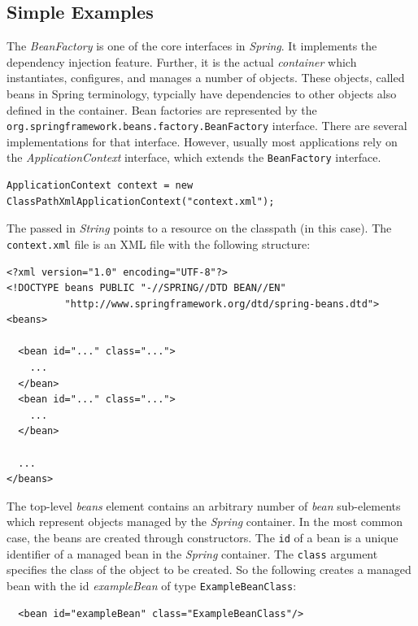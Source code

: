 \subsection{Simple Examples}

The \emph{BeanFactory} is one of the core interfaces in \emph{Spring}. It
implements the dependency injection feature. Further, it is the actual
\emph{container} which instantiates, configures, and manages a number of
objects. These objects, called beans in Spring terminology, typcially have
dependencies to other objects also defined in the container. Bean factories
are represented by the \texttt{org.springframework.beans.factory.BeanFactory}
interface. There are several implementations for that interface. However,
usually most applications rely on the \emph{ApplicationContext} interface, which
extends the \texttt{BeanFactory} interface.

\begin{verbatim}
ApplicationContext context = new ClassPathXmlApplicationContext("context.xml");
\end{verbatim}

The passed in \emph{String} points to a resource on the classpath (in this 
case). The \texttt{context.xml} file is an XML file with the following
structure:

\small{\begin{verbatim}
<?xml version="1.0" encoding="UTF-8"?>
<!DOCTYPE beans PUBLIC "-//SPRING//DTD BEAN//EN" 
          "http://www.springframework.org/dtd/spring-beans.dtd">
<beans>
  
  <bean id="..." class="...">
    ...
  </bean>
  <bean id="..." class="...">
    ...
  </bean>

  ...
</beans>
\end{verbatim}}

The top-level \emph{beans} element contains an arbitrary number of \emph{bean}
sub-elements which represent objects managed by the \emph{Spring} container.
In the most common case, the beans are created through constructors. The
\texttt{id} of a bean is a unique identifier of a managed bean in the 
\emph{Spring} container. The \texttt{class} argument specifies the class
of the object to be created. So the following creates a managed bean
with the id \emph{exampleBean} of type \texttt{ExampleBeanClass}:

\small{\begin{verbatim}
  <bean id="exampleBean" class="ExampleBeanClass"/>  
\end{verbatim}}

